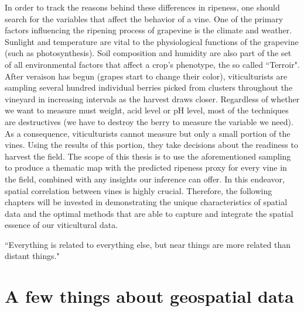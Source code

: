 \documentclass[12pt,a4paper,oneside]{book}
\theoremstyle{plain}
\theoremstyle{definition}
\begin{document}
{\vspace{3mm}\newline
In order to track the reasons behind these differences in ripeness, one should search for the variables that affect the behavior of a vine. One of the primary factors influencing the ripening process of grapevine is the climate and weather. Sunlight and temperature are vital to the physiological functions of the grapevine (such as photosynthesis). Soil composition and humidity are also part of the set of all environmental factors that affect a crop's phenotype, the so called ``Terroir".   
\vspace{3mm}\newline  
After veraison has begun (grapes start to change their color), viticulturists are sampling several hundred individual berries picked from clusters throughout the vineyard in increasing intervals as the harvest draws closer. Regardless of whether we want to measure must weight, acid level or pH level, most of the techniques are destructives (we have to destroy the berry to measure the variable we need). As a consequence, viticulturists cannot measure but only a small portion of the vines. Using the results of this portion, they take decisions about the readiness to harvest the field.   
\vspace{3mm}\newline  
The scope of this thesis is to use the aforementioned sampling to produce a thematic map with the predicted ripeness proxy for every vine in the field, combined with any insights our inference can offer. In this endeavor, spatial correlation between vines is highly crucial. Therefore, the following chapters will be invested in demonstrating the unique characteristics of spatial data and the optimal methods that are able to capture and integrate the spatial essence of our viticultural data.  

\begin{savequote}[45mm] 
``Everything is related to everything else, but near things are more related than distant things."
\end{savequote}
\chapter{A few things about geospatial data}
}
\end{document}
